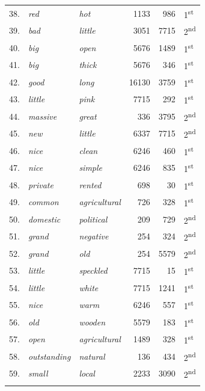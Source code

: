 \begin{table}[!htbp]
{\begin{tabular}[t]{rllrrl}
38. &  \textit{red} & \textit{hot} & \num{1133} & \num{986} & 1\textsuperscript{st} \\
39. &  \textit{bad} & \textit{little} & \num{3051} & \num{7715} & 2\textsuperscript{nd} \\
40. &  \textit{big} & \textit{open} & \num{5676} & \num{1489} & 1\textsuperscript{st} \\
41. &  \textit{big} & \textit{thick} & \num{5676} & \num{346} & 1\textsuperscript{st} \\
42. &  \textit{good} & \textit{long} & \num{16130} & \num{3759} & 1\textsuperscript{st} \\
43. &  \textit{little} & \textit{pink} & \num{7715} & \num{292} & 1\textsuperscript{st} \\
44. &  \textit{massive} & \textit{great} & \num{336} & \num{3795} & 2\textsuperscript{nd} \\
45. &  \textit{new} & \textit{little} & \num{6337} & \num{7715} & 2\textsuperscript{nd} \\
46. &  \textit{nice} & \textit{clean} & \num{6246} & \num{460} & 1\textsuperscript{st} \\
47. &  \textit{nice} & \textit{simple} & \num{6246} & \num{835} & 1\textsuperscript{st} \\
48. &  \textit{private} & \textit{rented} & \num{698} & \num{30} & 1\textsuperscript{st} \\
49. &  \textit{common} & \textit{agricultural} & \num{726} & \num{328} & 1\textsuperscript{st} \\
50. &  \textit{domestic} & \textit{political} & \num{209} & \num{729} & 2\textsuperscript{nd} \\
51. &  \textit{grand} & \textit{negative} & \num{254} & \num{324} & 2\textsuperscript{nd} \\
52. &  \textit{grand} & \textit{old} & \num{254} & \num{5579} & 2\textsuperscript{nd} \\
53. &  \textit{little} & \textit{speckled} & \num{7715} & \num{15} & 1\textsuperscript{st} \\
54. &  \textit{little} & \textit{white} & \num{7715} & \num{1241} & 1\textsuperscript{st} \\
55. &  \textit{nice} & \textit{warm} & \num{6246} & \num{557} & 1\textsuperscript{st} \\
56. &  \textit{old} & \textit{wooden} & \num{5579} & \num{183} & 1\textsuperscript{st} \\
57. &  \textit{open} & \textit{agricultural} & \num{1489} & \num{328} & 1\textsuperscript{st} \\
58. &  \textit{outstanding} & \textit{natural} & \num{136} & \num{434} & 2\textsuperscript{nd} \\
59. &  \textit{small} & \textit{local} & \num{2233} & \num{3090} & 2\textsuperscript{nd} \\
\lspbottomrule
\end{tabular}}
\end{table}

